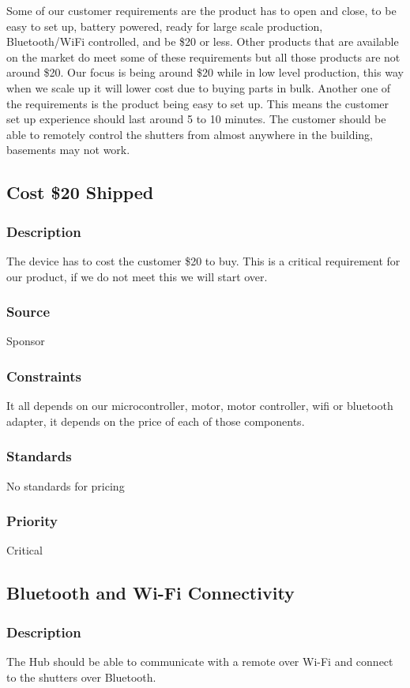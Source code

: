 Some of our customer requirements are the product has to open and close, to be easy to set up, battery powered, ready for large scale production, Bluetooth/WiFi controlled, and be \$20 or less. Other products that are available on the market do meet some of these requirements but all those products are not around \$20. Our focus is being around \$20 while in low level production, this way when we scale up it will lower cost due to buying parts in bulk. Another one of the requirements is the product being easy to set up. This means the customer set up experience should last around 5 to 10 minutes. The customer should be able to remotely control the shutters from almost anywhere in the building, basements may not work.

\subsection{Cost \$20 Shipped}
\subsubsection{Description}
The device has to cost the customer \$20 to buy. This is a critical requirement for our product, if we do not meet this we will start over.

\subsubsection{Source}
Sponsor
\subsubsection{Constraints}
It all depends on our microcontroller, motor, motor controller, wifi or bluetooth adapter, it depends on the price of each of those components.

\subsubsection{Standards}
No standards for pricing
\subsubsection{Priority}
Critical

\subsection{Bluetooth and Wi-Fi Connectivity}
\subsubsection{Description}
The Hub should be able to communicate with a remote over Wi-Fi and connect to the shutters over Bluetooth.

